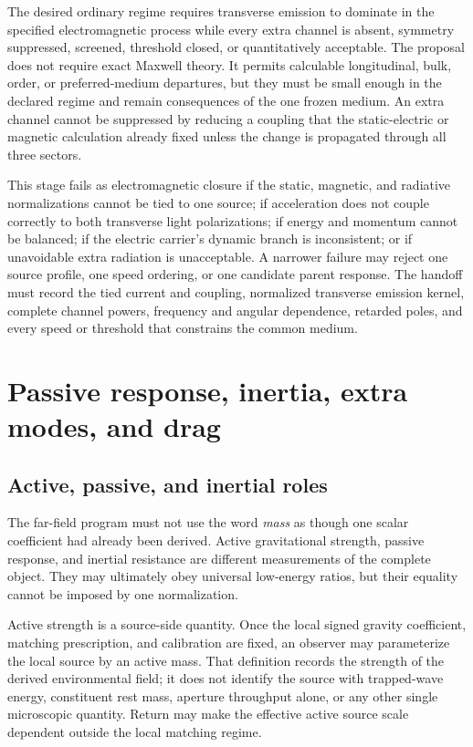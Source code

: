 The desired ordinary regime requires transverse emission to dominate in the
specified electromagnetic process while every extra channel is absent,
symmetry suppressed, screened, threshold closed, or quantitatively acceptable.
The proposal does not require exact Maxwell theory. It permits calculable
longitudinal, bulk, order, or preferred-medium departures, but they must be
small enough in the declared regime and remain consequences of the one frozen
medium. An extra channel cannot be suppressed by reducing a coupling that the
static-electric or magnetic calculation already fixed unless the change is
propagated through all three sectors.

This stage fails as electromagnetic closure if the static, magnetic, and
radiative normalizations cannot be tied to one source; if acceleration does not
couple correctly to both transverse light polarizations; if energy and momentum
cannot be balanced; if the electric carrier's dynamic branch is inconsistent;
or if unavoidable extra radiation is unacceptable. A narrower failure may
reject one source profile, one speed ordering, or one candidate parent response.
The handoff must record the tied current and coupling, normalized transverse
emission kernel, complete channel powers, frequency and angular dependence,
retarded poles, and every speed or threshold that constrains the common medium.

\section{Passive response, inertia, extra modes, and drag}

\subsection{Active, passive, and inertial roles}

The far-field program must not use the word \emph{mass} as though one scalar
coefficient had already been derived. Active gravitational strength, passive
response, and inertial resistance are different measurements of the complete
object. They may ultimately obey universal low-energy ratios, but their equality
cannot be imposed by one normalization.

Active strength is a source-side quantity. Once the local signed gravity
coefficient, matching prescription, and calibration are fixed, an observer may
parameterize the local source by an active mass. That definition records the
strength of the derived environmental field; it does not identify the source
with trapped-wave energy, constituent rest mass, aperture throughput alone, or
any other single microscopic quantity. Return may make the effective active
source scale dependent outside the local matching regime.

